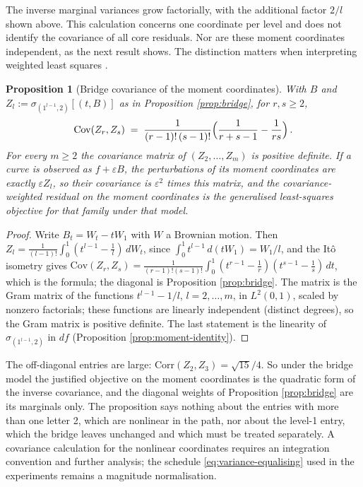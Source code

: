 \documentclass[11pt,english]{article}
\newtheorem{proposition}[theorem]{Proposition}
\theoremstyle{definition}
\theoremstyle{remark}
\begin{document}
The inverse marginal variances grow factorially, with the additional
factor $2/l$ shown above. This calculation concerns one coordinate
per level and does not identify the covariance of all core residuals.
Nor are these moment coordinates independent, as the next result
shows. The distinction matters when interpreting weighted least
squares \cite{Aitken}.

\begin{proposition}[Bridge covariance of the moment coordinates]
\label{prop:bridgecov}
With $B$ and $Z_{l}:=\sigma_{(1^{l-1},2)}[(t,B)]$ as in Proposition
\ref{prop:bridge}, for $r,s\geq2$,
\[
\mathrm{Cov}(Z_{r},Z_{s})\;=\;\frac{1}{(r-1)!\,(s-1)!}\Bigl(\frac{1}{r+s-1}-\frac{1}{rs}\Bigr)\,.
\]
For every $m\geq2$ the covariance matrix of $(Z_{2},\ldots,Z_{m})$ is
positive definite. If a curve is observed as $f+\varepsilon B$, the
perturbations of its moment coordinates are exactly $\varepsilon Z_{l}$,
so their covariance is $\varepsilon^{2}$ times this matrix, and the
covariance-weighted residual on the moment coordinates is the
generalised least-squares objective for that family under that model.
\end{proposition}

\begin{proof}
Write $B_{t}=W_{t}-tW_{1}$ with $W$ a Brownian motion. Then
$Z_{l}=\frac{1}{(l-1)!}\int_{0}^{1}(t^{l-1}-\tfrac{1}{l})\,dW_{t}$,
since $\int_{0}^{1}t^{l-1}\,d(tW_{1})=W_{1}/l$, and the It\^{o} isometry
gives $\mathrm{Cov}(Z_{r},Z_{s})=\frac{1}{(r-1)!(s-1)!}\int_{0}^{1}(t^{r-1}-\tfrac{1}{r})(t^{s-1}-\tfrac{1}{s})\,dt$,
which is the formula; the diagonal is Proposition \ref{prop:bridge}.
The matrix is the Gram matrix of the functions $t^{l-1}-1/l$,
$l=2,\ldots,m$, in $L^{2}(0,1)$, scaled by nonzero factorials; these
functions are linearly independent (distinct degrees), so the Gram
matrix is positive definite. The last statement is the linearity of
$\sigma_{(1^{l-1},2)}$ in $df$ (Proposition \ref{prop:moment-identity}).
\end{proof}

The off-diagonal entries are large: $\mathrm{Corr}(Z_{2},Z_{3})=\sqrt{15}/4$.
So under the bridge model the justified objective on the moment
coordinates is the quadratic form of the inverse covariance, and the
diagonal weights of Proposition \ref{prop:bridge} are its marginals
only. The proposition says nothing about the entries with more than
one letter 2, which are nonlinear in the path, nor about the level-1
entry, which the bridge leaves unchanged and which must be treated separately.
A covariance calculation for the nonlinear coordinates requires an
integration convention and further analysis; the schedule \eqref{eq:variance-equalising} used in the
experiments remains a magnitude normalisation.
\end{document}
